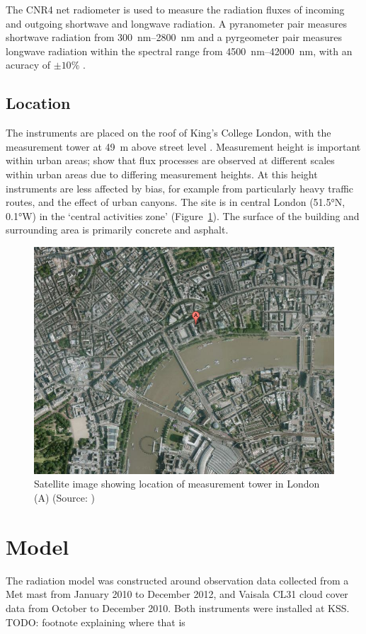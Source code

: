 \documentclass[a4paper,titlepage, twoside]{report}
\begin{document}
The CNR4 net radiometer is used to measure the radiation fluxes of incoming and outgoing shortwave and longwave radiation. A pyranometer pair measures shortwave radiation from \SIrange{300}{2800}{\nano\meter} and a pyrgeometer pair measures longwave radiation within the spectral range from \SIrange{4500}{42000}{\nano\meter}, with an acuracy of $\pm10\%$ \parencite{kipp}.

\section{Location}
The instruments are placed on the roof of King's College London, with the measurement tower at \SI{49}{\meter} above street level \parencite{kotthaus}.  Measurement height is important within urban areas; \cite{kotthaus} show that flux processes are observed at different scales within urban areas due to differing measurement heights. At this height instruments are less affected by bias, for example from particularly heavy traffic routes, and the effect of urban canyons. The site is in central London (\ang{51.5}N, \ang{0.1}W) in the `central activities zone' \parencite{kotthaus} (Figure~\ref{fig:location}).  The surface of the building and surrounding area is primarily concrete and asphalt.

\begin{figure}
\includegraphics[width=\textwidth]{map.png}
\caption{Satellite image showing location of measurement tower in London (A) (Source: \cite{google-maps})}
\label{fig:location}
\end{figure}


\chapter{Model}
The radiation model was constructed around observation data collected from a Met mast from January 2010 to December 2012, and Vaisala CL31 cloud cover data from October to December 2010.  Both instruments were installed at KSS. TODO: footnote explaining where that is
\end{document}
